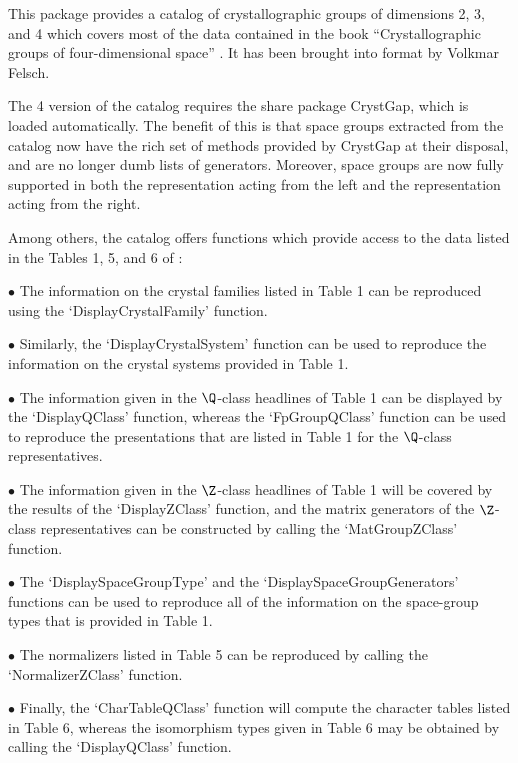 \def\x{\times}



This package provides a catalog of crystallographic groups of
dimensions 2, 3, and 4 which covers most of the data contained 
in the book ``Crystallographic groups of four-dimensional space''
\cite{BBNWZ78}.  It has been brought into {\GAP} format by Volkmar
Felsch.

The {\GAP} 4 version of the catalog requires the share package CrystGap,
which is loaded automatically. The benefit of this is that space groups 
extracted from the catalog now have the rich set of methods provided
by CrystGap at their disposal, and are no longer dumb lists of generators.
Moreover, space groups are now fully supported in both the representation
acting from the left and the representation acting from the right.


Among others, the catalog offers functions which provide access to the
data listed in the Tables 1, 5, and 6 of \cite{BBNWZ78}:

\beginlist 
\item{$\bullet$} 
    The information on the crystal families listed in Table 1 can
    be reproduced using the `DisplayCrystalFamily' function.
\item{$\bullet$} 
    Similarly, the `DisplayCrystalSystem' function can be
    used to reproduce the information on the crystal systems
    provided in Table 1.
\item{$\bullet$} 
    The information given in the $\Q$-class headlines of
    Table 1 can be displayed by the `DisplayQClass' function,
    whereas the `FpGroupQClass' function can be used to reproduce
    the presentations that are listed in Table 1 for the $\Q$-class
    representatives.
\item{$\bullet$} 
    The information given in the $\Z$-class headlines of Table 1
    will be covered by the results of the `DisplayZClass' function,
    and the matrix generators of the $\Z$-class representatives can
    be constructed by calling the `MatGroupZClass' function.
\item{$\bullet$} 
    The `DisplaySpaceGroupType' and the
    `DisplaySpaceGroupGenerators' functions can be used to
    reproduce all of the information on the space-group types that
    is provided in Table 1.
\item{$\bullet$} 
    The normalizers listed in Table 5 can be reproduced by
    calling the `NormalizerZClass' function.
\item{$\bullet$} 
    Finally, the `CharTableQClass' function will compute the
    character tables listed in Table 6, whereas the isomorphism
    types given in Table 6 may be obtained by calling the
    `DisplayQClass' function.  
\endlist

